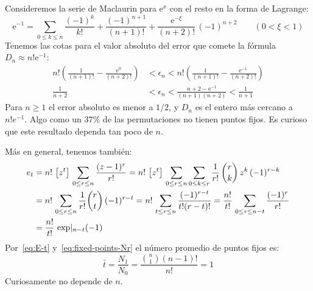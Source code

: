 \begin{enumerate}
    Consideremos la serie de Maclaurin%
    para \(\mathrm{e}^x\)
    con el resto en la forma de Lagrange:%
    \begin{equation*}
      \mathrm{e}^{-1}
	= \sum_{0 \le k \le n} \frac{(-1)^k}{k!}
	    + \frac{(-1)^{n + 1}}{(n + 1)!}
	    + \frac{\mathrm{e}^{-\xi}}{(n + 2)!} \, (-1)^{n + 2}
      \qquad (0 < \xi < 1)
    \end{equation*}
    Tenemos las cotas para el valor absoluto
    del error que comete
    la fórmula \(D_n \approx n! \mathrm{e}^{-1}\):
    \begin{align*}
      n ! \left(
	    \frac{1}{(n + 1)!} - \frac{\mathrm{e}^0}{(n + 2)!}
	  \right)
	&< \epsilon_n
	 < n! \left(
		\frac{1}{(n + 1)!}
		  - \frac{\mathrm{e}^{-1}}{(n + 2)!}
	      \right) \\
      \frac{1}{n + 2}
	&< \epsilon_n
	 < \frac{n + 2 - \mathrm{e}^{-1}}{(n + 1) (n + 2)}
	 < \frac{1}{n + 1}
    \end{align*}
    Para \(n \ge 1\) el error absoluto es menor a \(1 / 2\),
    y \(D_n\) es el entero más cercano a \(n! e^{-1}\).
    Algo como un \(37\)\%
    de las permutaciones no tienen puntos fijos.
    Es curioso que este resultado dependa tan poco de \(n\).

    Más en general,
    tenemos también:
    \begin{align}
      e_t
	&= n! \, \left[ z^t \right] \, \sum_{0 \le r \le n}
					 \frac{(z - 1)^r}{r!}
	 = n! \, \left[ z^t \right] \,
		   \sum_{0 \le r \le n}
		     \sum_{0 \le k \le r}
		       \frac{1}{r!} \,
			 \binom{r}{k} \, z^k \,
			 (-1)^{r - k} \notag \\
	&= n! \, \sum_{0 \le r \le n}
		   \frac{1}{r!} \binom{r}{t} \, (-1)^{r - t}
	 = n! \, \sum_{t \le r \le n}
		   \frac{(-1)^{r - t}}{t! (r - t)!}
	 = \frac{n!}{t!} \,
	      \sum_{0 \le r \le n - t} \frac{(-1)^r}{r!} \notag \\
	&= \frac{n!}{t!} \, \exp \rvert_{n - t} (-1)
	\label{eq:t-puntos-fijos}
    \end{align}
    Por~\ref{eq:E-t} y~\ref{eq:fixed-points-Nr}
    el número promedio de puntos fijos es:
    \begin{equation*}
      \bar{t}
	= \frac{N_1}{N_0}
	= \frac{\binom{n}{1} (n - 1)!}{n!}
	= 1
    \end{equation*}
    Curiosamente no depende de \(n\).
  \end{enumerate}

